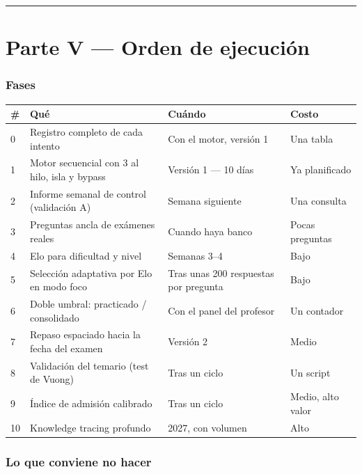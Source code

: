 \documentclass[11pt,a4paper]{article}
\begin{document}
\vspace{12pt}
\hrule
\vspace{14pt}

\part*{Parte V --- Orden de ejecución}

\section{Fases}

\begin{center}
\small
\begin{longtable}{p{0.7cm}p{5.6cm}p{3.5cm}p{4.2cm}}
\toprule
\textbf{\#} & \textbf{Qué} & \textbf{Cuándo} & \textbf{Costo} \\
\midrule
\endhead
0 & Registro completo de cada intento & Con el motor, versión 1 & Una tabla \\
1 & Motor secuencial con 3 al hilo, isla y bypass & Versión 1 --- 10 días & Ya planificado \\
2 & Informe semanal de control (validación A) & Semana siguiente & Una consulta \\
3 & Preguntas ancla de exámenes reales & Cuando haya banco & Pocas preguntas \\
4 & Elo para dificultad y nivel & Semanas 3--4 & Bajo \\
5 & Selección adaptativa por Elo en modo foco & Tras unas 200 respuestas por pregunta & Bajo \\
6 & Doble umbral: practicado / consolidado & Con el panel del profesor & Un contador \\
7 & Repaso espaciado hacia la fecha del examen & Versión 2 & Medio \\
8 & Validación del temario (test de Vuong) & Tras un ciclo & Un script \\
9 & Índice de admisión calibrado & Tras un ciclo & Medio, alto valor \\
10 & Knowledge tracing profundo & 2027, con volumen & Alto \\
\bottomrule
\end{longtable}
\end{center}

\section{Lo que conviene no hacer}
\end{document}
